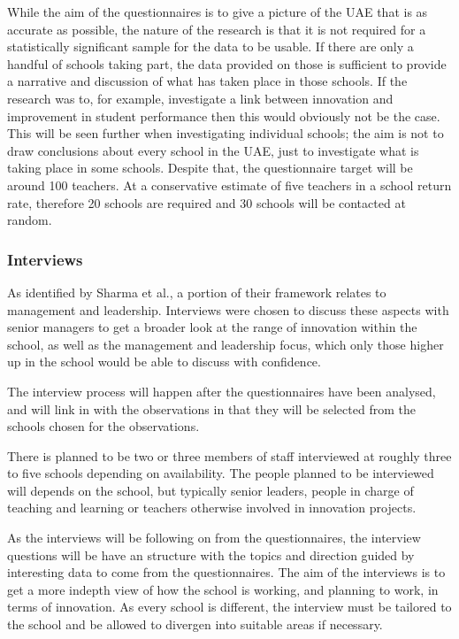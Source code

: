 While the aim of the questionnaires is to give a picture of the UAE that is as accurate as possible, the nature of the research is that it is not required for a statistically significant sample for the data to be usable. If there are only a handful of schools taking part, the data provided on those is sufficient to provide a narrative and discussion of what has taken place in those schools. If the research was to, for example, investigate a link between innovation and improvement in student performance then this would obviously not be the case. This will be seen further when investigating individual schools; the aim is not to draw conclusions about every school in the UAE, just to investigate what is taking place in some schools.
Despite that, the questionnaire target will be around 100 teachers. At a conservative estimate of five teachers in a school return rate, therefore 20 schools are required and 30 schools will be contacted at random.

\subsubsection{Interviews}
As identified by Sharma et al., a portion of their framework relates to management and leadership. Interviews were chosen to discuss these aspects with senior managers to get a broader look at the range of innovation within the school, as well as the management and leadership focus, which only those higher up in the school would be able to discuss with confidence.

The interview process will happen after the questionnaires have been analysed, and will link in with the observations in that they will be selected from the schools chosen for the observations.

There is planned to be two or three members of staff interviewed at roughly three to five schools depending on availability. The people planned to be interviewed will depends on the school, but typically senior leaders, people in charge of teaching and learning or teachers otherwise involved in innovation projects.

As the interviews will be following on from the questionnaires, the interview questions will be have an structure with the topics and direction guided by interesting data to come from the questionnaires. The aim of the interviews is to get a more indepth view of how the school is working, and planning to work, in terms of innovation. As every school is different, the interview must be tailored to the school and be allowed to divergen into suitable areas if necessary. 

